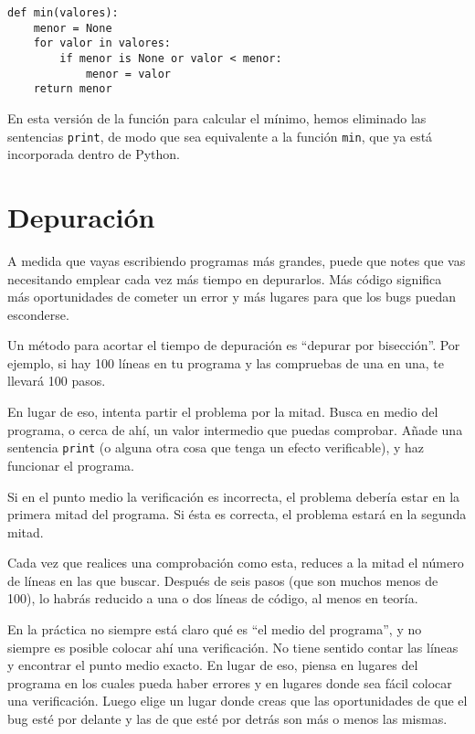 \beforeverb
\begin{verbatim}
def min(valores):
    menor = None
    for valor in valores:
        if menor is None or valor < menor:
            menor = valor
    return menor
\end{verbatim}
\afterverb
%
En esta versión de la función para calcular el mínimo, hemos eliminado las
sentencias {\tt print}, de modo que sea equivalente a la función {\tt min},
que ya está incorporada dentro de Python.

\section{Depuración}

A medida que vayas escribiendo programas más grandes, puede que notes que vas necesitando
emplear cada vez más tiempo en depurarlos. Más código significa más oportunidades de
cometer un error y más lugares para que los bugs puedan esconderse.


Un método para acortar el tiempo de depuración es ``depurar por bisección''.
Por ejemplo, si hay 100 líneas en tu programa y las compruebas
de una en una, te llevará 100 pasos.

En lugar de eso, intenta partir el problema por la mitad. Busca en medio
del programa, o cerca de ahí, un valor intermedio que puedas
comprobar. Añade una sentencia {\tt print} (o alguna otra cosa
que tenga un efecto verificable), y haz funcionar el programa.

Si en el punto medio la verificación es incorrecta, el problema debería
estar en la primera mitad del programa. Si ésta es correcta, el problema
estará en la segunda mitad.

Cada vez que realices una comprobación como esta, reduces a la mitad el número
de líneas en las que buscar. Después de seis pasos (que son muchos
menos de 100), lo habrás reducido a una o dos líneas de código,
al menos en teoría.

En la práctica no siempre está claro qué es
``el medio del programa'', y no siempre es posible colocar ahí
una verificación. No tiene sentido contar las líneas y encontrar
el punto medio exacto. En lugar de eso, piensa en lugares del programa
en los cuales pueda haber errores y en lugares donde sea fácil colocar una verificación.
Luego elige un lugar donde creas que las oportunidades de que el bug
esté por delante y las de que esté por detrás son más o menos las mismas.

